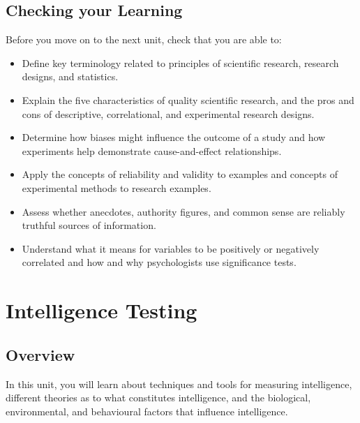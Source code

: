 \documentclass[
]{book}
\providecommand{\tightlist}{%
  \setlength{\itemsep}{0pt}\setlength{\parskip}{0pt}}
\begin{document}
\hypertarget{checking-your-learning}{%
\section*{Checking your Learning}\label{checking-your-learning}}

\begin{progress}
Before you move on to the next unit, check that you are able to:

\begin{itemize}
\tightlist
\item
  Define key terminology related to principles of scientific research, research designs, and statistics.
\item
  Explain the five characteristics of quality scientific research, and the pros and cons of descriptive, correlational, and experimental research designs.
\item
  Determine how biases might influence the outcome of a study and how experiments help demonstrate cause-and-effect relationships.
\item
  Apply the concepts of reliability and validity to examples and concepts of experimental methods to research examples.
\item
  Assess whether anecdotes, authority figures, and common sense are reliably truthful sources of information.
\item
  Understand what it means for variables to be positively or negatively correlated and how and why psychologists use significance tests.
\end{itemize}
\end{progress}

\hypertarget{intelligence-testing}{%
\chapter{Intelligence Testing}\label{intelligence-testing}}

\hypertarget{overview-1}{%
\section*{Overview}\label{overview-1}}

In this unit, you will learn about techniques and tools for measuring intelligence, different theories as to what constitutes intelligence, and the biological, environmental, and behavioural factors that influence intelligence.
\end{document}
